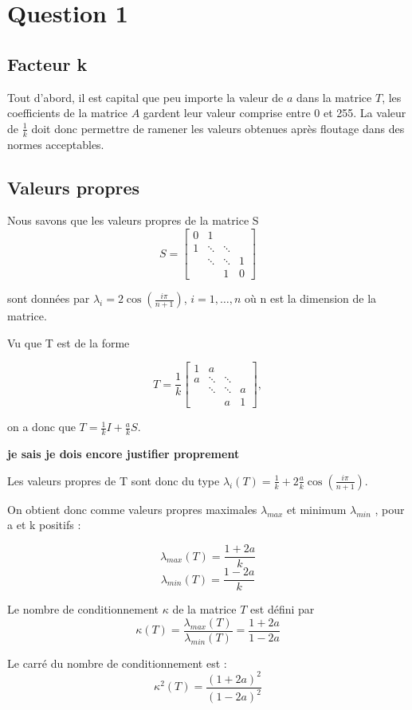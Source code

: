 \section{Question 1}

\subsection{Facteur k}
	Tout d'abord, il  est capital que peu importe la valeur de $\textit{a}$ dans la matrice $\textit{T}$, les coefficients de la matrice $\textit{A}$ gardent leur valeur comprise entre 0 et 255. La valeur de $\frac{1}{k}$ doit donc permettre de ramener les valeurs obtenues après floutage dans des normes acceptables.
	
	
\subsection{Valeurs propres}
	Nous savons que les valeurs propres de la matrice S 
	$$
S = 	
 \left[
 \begin{array}{cccc}
    0 & 1 		& 			& \\
    1 & \ddots 	& \ddots 	& \\
      & \ddots 	& \ddots 	& 1 \\
      & 		& 1			& 0
  \end{array}
  \right]
$$

sont données par $\lambda_i = 2 \cos(\frac{i\pi}{n+1})$, $i= 1, \ldots , n$ où n est la dimension de la matrice.

Vu que T est de la forme 

$$
 T = \frac{1}{k}
 \left[
 \begin{array}{cccc}
    1 & a 		& 			& \\
    a & \ddots 	& \ddots 	& \\
      & \ddots 	& \ddots 	& a \\
      & 		& a			& 1
  \end{array}
  \right] ,
$$

on a donc que $T = \frac{1}{k} I + \frac{a}{k} S$.

\textbf{je sais je dois encore justifier proprement}

Les valeurs propres de T sont donc du type $\lambda_i(T) = \frac{1}{k} + 2 \frac{a}{k} \cos(\frac{i\pi}{n+1})$.

On obtient donc comme valeurs propres maximales $\lambda_{max}$ et minimum $\lambda_{min}$ , pour a et k positifs : 

	$$\lambda_{max} (T) =  \frac{1+2a}{k} $$
	$$\lambda_{min} (T) =  \frac{1-2a}{k} $$
	
Le nombre de conditionnement $\kappa$ de la matrice $T$ est défini par 
\begin{equation}
	\kappa (T) = \frac{\lambda_{max} (T)}{\lambda_{min} (T)} = \frac{1+2a}{1-2a}
\end{equation}
	
Le carré du nombre de conditionnement est :
\begin{equation}
	\kappa^2 (T) = \frac{(1+2a)^2}{(1-2a)^2}
\end{equation}
	

